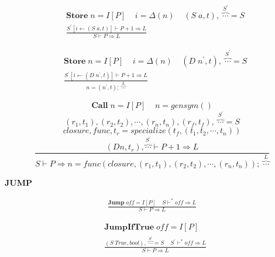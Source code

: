 \documentclass[12pt, a4paper]{report}
\newcommand{\ddfrac}[3]{
    & #1 \\
    & \frac { #2 } { #3 }
}
\newcommand{\rulegroup}[1]{
    \textbf{#1}
}
\newcommand{\gap}{ \;\;\;\; }
\begin{document}
\begin{equation*}
\begin{split}
\ddfrac{
    \mathbf{Store} \; n = I[P]
    \gap
    i = \Delta(n)
    \gap
    (S \; a, t) ,\; \overbrace{\cdots}^{S^{'}} = S
}{
    S^{'}[i \leftarrow (S \; a, t)] \vdash P + 1 \Rightarrow L
}{
    S \vdash P \Rightarrow L
}
\end{split}
\end{equation*}

\begin{equation*}
\begin{split}
\ddfrac{
    \mathbf{Store} \; n = I[P]
    \gap
    i = \Delta(n)
    \gap
    (D \; n^{'}, t) ,\; \overbrace{\cdots}^{S^{'}} = S
}{
    S^{'}[i \leftarrow (D \; n^{'}, t)] \vdash P + 1 \Rightarrow L
}{
    n = (n^{'}, t); \;  \overbrace{\cdots}^{L}
}
\end{split}
\end{equation*}

\vspace*{\baselineskip}
$$
\mathbf{Call} \; n = I[P] \gap n = gensym()
$$
\vspace*{-\baselineskip}
$$
(r_1, t_1), (r_2, t_2) , \cdots, (r_n, t_n), (r_f, t_f), \; \overbrace{\cdots}^{S^{'}} = S
$$
\vspace*{-\baselineskip}
$$
closure, func, t_r = specialize(t_f, (t_1, t_2, \cdots, t_n))
$$
\vspace*{-\baselineskip}
$$
\dfrac{
    (D n, t_r), \overbrace{\cdots}^{S^{'}} \vdash P + 1 \Rightarrow L
}{
    S \vdash P \Rightarrow n = func (closure, (r_1, t_1), (r_2, t_2), \cdots, (r_n, t_n)) ; \; \overbrace{\cdots}^{L}
}
$$

\vspace*{\baselineskip}
\hrulefill
\vspace*{\baselineskip}

\rulegroup{JUMP}

\begin{equation*}
\begin{split}
\frac{ \mathbf{Jump} \; \mathit{off} = I[P] \;\;\;\; S \vdash^{*} \mathit{off} \Rightarrow L}
     { S \vdash P \Rightarrow L}
\end{split}
\end{equation*}


\begin{equation*}
\begin{split}
\ddfrac{
    \mathbf{JumpIfTrue} \; \mathit{off} = I[P]
}{
    (S \; True, bool), \; \overbrace{\cdots}^{S^{'}} = S
    \gap
    S^{'} \vdash^{*} \mathit{off} \Rightarrow L
}{ S \vdash P \Rightarrow L }
\end{split}
\end{equation*}
\end{document}

